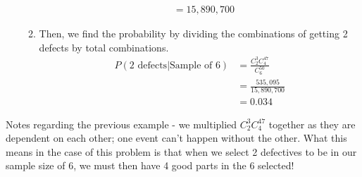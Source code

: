 \documentclass[../IND E 315.tex]{subfiles}
\begin{document}
\begin{enumerate}
\begin{enumerate}
\begin{equation*}
\begin{aligned}
                                &= 15,890,700
                    \end{aligned}
                \end{equation*}
            \item Then, we find the probability by dividing the combinations of getting 2 defects by total combinations.
                \begin{equation*}
                    \begin{aligned}
                        P(2\text{ defects}|\text{Sample of }6) &= \frac{C^3_2 C^{47}_4}{C^{50}_6} \\
                                &= \frac{535,095}{15,890,700} \\
                                &= 0.034
                    \end{aligned}
                \end{equation*}
        \end{enumerate}
\end{enumerate}
Notes regarding the previous example - we multiplied $C^3_2 C^{47}_4$ together as they are dependent on each other; one event can't happen without the other. What this means in the case of this problem is that when we select 2 defectives to be in our sample size of 6, we must then have 4 good parts in the 6 selected!
\end{document}
